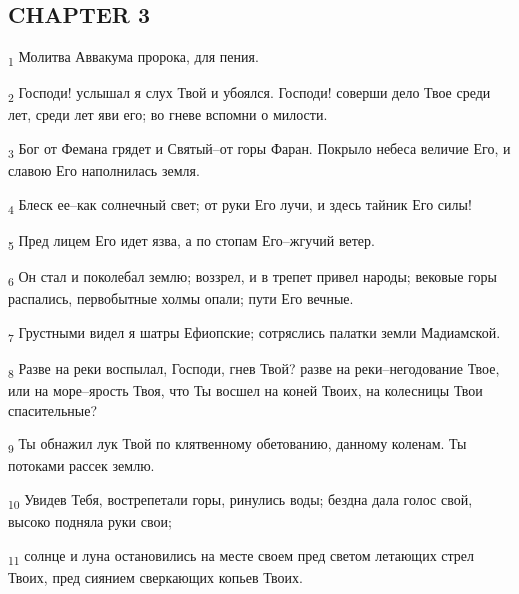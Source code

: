 \subsection{CHAPTER 3}
\begin{tcolorbox}
\textsubscript{1} Молитва Аввакума пророка, для пения.
\end{tcolorbox}
\begin{tcolorbox}
\textsubscript{2} Господи! услышал я слух Твой и убоялся. Господи! соверши дело Твое среди лет, среди лет яви его; во гневе вспомни о милости.
\end{tcolorbox}
\begin{tcolorbox}
\textsubscript{3} Бог от Фемана грядет и Святый--от горы Фаран. Покрыло небеса величие Его, и славою Его наполнилась земля.
\end{tcolorbox}
\begin{tcolorbox}
\textsubscript{4} Блеск ее--как солнечный свет; от руки Его лучи, и здесь тайник Его силы!
\end{tcolorbox}
\begin{tcolorbox}
\textsubscript{5} Пред лицем Его идет язва, а по стопам Его--жгучий ветер.
\end{tcolorbox}
\begin{tcolorbox}
\textsubscript{6} Он стал и поколебал землю; воззрел, и в трепет привел народы; вековые горы распались, первобытные холмы опали; пути Его вечные.
\end{tcolorbox}
\begin{tcolorbox}
\textsubscript{7} Грустными видел я шатры Ефиопские; сотряслись палатки земли Мадиамской.
\end{tcolorbox}
\begin{tcolorbox}
\textsubscript{8} Разве на реки воспылал, Господи, гнев Твой? разве на реки--негодование Твое, или на море--ярость Твоя, что Ты восшел на коней Твоих, на колесницы Твои спасительные?
\end{tcolorbox}
\begin{tcolorbox}
\textsubscript{9} Ты обнажил лук Твой по клятвенному обетованию, данному коленам. Ты потоками рассек землю.
\end{tcolorbox}
\begin{tcolorbox}
\textsubscript{10} Увидев Тебя, вострепетали горы, ринулись воды; бездна дала голос свой, высоко подняла руки свои;
\end{tcolorbox}
\begin{tcolorbox}
\textsubscript{11} солнце и луна остановились на месте своем пред светом летающих стрел Твоих, пред сиянием сверкающих копьев Твоих.
\end{tcolorbox}
